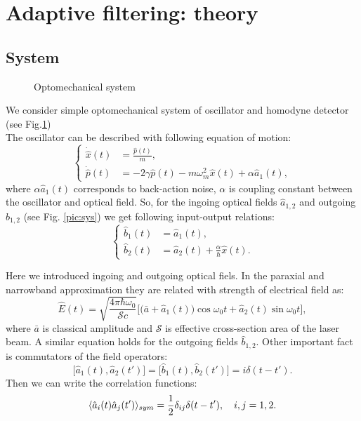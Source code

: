 \section{Adaptive filtering: theory}\label{sec:th}
\subsection{System}

\begin{figure}
\caption{Optomechanical system}
\label{scheme}
\end{figure}

We consider simple optomechanical system of oscillator and homodyne detector (see Fig.\ref{scheme})\\
The oscillator can be described with following equation of motion:
\begin{equation}
\begin{cases}
 \dot{\hat{x}}(t) &= \frac{\hat{p}(t)}{m},\\
 \dot{\hat{p}}(t) &= -2\gamma \hat{p}(t) - m\omega_m^2 \hat{x}(t) + \alpha \hat{a}_1(t),
\end{cases}
\end{equation}
where $\alpha \hat{a}_1(t)$ corresponds to back-action noise, $\alpha$ is coupling constant between the oscillator and optical field.
So, for the ingoing optical fields $\hat{a}_{1,2}$ and outgoing $\hat{b}_{1,2}$ (see Fig. \ref{pic:sys}) we get following input-output relations:
\begin{equation}
\begin{cases}
 \hat{b}_1(t) &= \hat{a}_1(t),\\
 \hat{b}_2(t) &= \hat{a}_2(t) + \frac{\alpha}{\hbar}\hat{x}(t)\label{b2_general}.
\end{cases}
\end{equation}

Here we introduced ingoing and outgoing optical fiels. In the paraxial and narrowband approximation they are related with strength of electrical field as:
\begin{equation}
 \hat{E}(t) = \sqrt{\frac{4\pi \hbar\omega_0}{\mathcal{S} c}} \bigl[\bigl(\bar{a}+\hat{a}_1(t)\bigr)\cos\omega_0t + \hat{a}_2(t)\sin\omega_0t\bigr],
\end{equation}
where $\bar{a}$ is classical amplitude and $\mathcal{S}$ is effective cross-section area of the laser beam. A similar equation holds for the outgoing fields $\hat{b}_{1,2}$.
Other important fact is commutators of the field operators:
\begin{equation}
 \bigl[\hat{a}_1(t),\hat{a}_2(t')\bigl] = \bigl[\hat{b}_1(t),\hat{b}_2(t')\bigl] = i \delta(t-t').
\end{equation}
Then we can write the correlation functions:
\begin{equation}
 \langle\hat{a}_i(t) \hat{a}_j(t')\rangle_{sym} = \frac{1}{2}\delta_{ij}\delta(t-t'), \quad i,j=1,2.
\end{equation}

